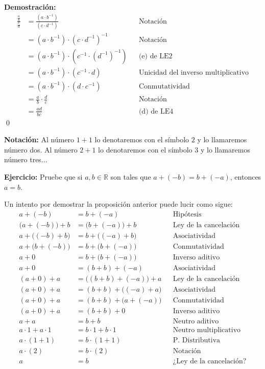 \documentclass[11pt]{article}
\newcommand{\R}{\mathbb{R}}
\begin{document}
\begin{enumerate}[label=\alph*)]
    \textbf{Demostración:}\begin{align*}
        \frac{\frac{a}{b}}{\frac{c}{d}} &= \frac{\left( a \cdot b^{-1} \right)}{\left( c \cdot d^{-1} \right)} && \text{Notación}\\
        &= \left( a \cdot b^{-1} \right) \cdot \left( c \cdot d^{-1} \right)^{-1} && \text{Notación}\\
        &= \left( a \cdot b^{-1} \right) \cdot \left( c^{-1} \cdot \left( d^{-1} \right) ^{-1} \right) && \text{(e) de LE2}\\
        &= \left( a \cdot b^{-1} \right) \cdot \left( c^{-1} \cdot d \right) && \text{Unicidad del inverso multiplicativo}\\
        &= \left( a \cdot b^{-1} \right) \cdot \left( d \cdot c^{-1} \right) && \text{Conmutatividad}\\
        &= \frac{a}{b} \cdot \frac{d}{c} && \text{Notación}\\
        &= \frac{ad}{bc} && \text{(d) de LE4}
    \end{align*} \qed

\end{enumerate}

\textbf{Notación:} Al número $1+1$ lo denotaremos con el símbolo $2$ y lo llamaremos número dos. Al número $2+1$ lo denotaremos con el símbolo $3$ y lo llamaremos número tres...

\textbf{Ejercicio:} Pruebe que si $a,b\in \R$ son tales que $a+(-b)=b+(-a)$, entonces $a=b$.
    
Un intento por demostrar la proposición anterior puede lucir como sigue: \begin{align*}
a+(-b)&=b+(-a) && \text{Hipótesis} \\
\bigl(a+(-b)\bigr)+b&=\bigl(b+(-a)\bigr)+b&&\text{Ley de la cancelación} \\
a + \bigl((-b)+b\bigr)&= b+\bigl((-a)+b\bigr)&&\text{Asociatividad} \\
a + \bigl(b+(-b)\bigr)&= b+\bigl(b+(-a)\bigr)&&\text{Conmutatividad} \\
a + 0&= b+\bigl(b+(-a)\bigr)&&\text{Inverso aditivo} \\
a + 0&= (b+b)+(-a)&&\text{Asociatividad} \\
(a + 0) + a&= \bigl((b+b)+(-a)\bigr)+a&&\text{Ley de la cancelación} \\
(a + 0) + a&= (b+b)+\bigl((-a)+a\bigr)&&\text{Asociatividad} \\
(a + 0) + a&= (b+b)+\bigl(a+(-a)\bigr)&&\text{Conmutatividad} \\
(a + 0) + a&= (b+b)+0&&\text{Inverso aditivo} \\
a+ a&= b+b&&\text{Neutro aditivo} \\
a\cdot 1+ a\cdot 1&= b\cdot 1+ b\cdot 1&&\text{Neutro multiplicativo} \\
a\cdot (1+1)&= b\cdot (1+1)&&\text{P. Distributiva} \\
a\cdot (2) &= b\cdot (2) &&\text{Notación} \\
a &= b && \text{¿Ley de la cancelación?}
\end{align*}
\end{document}
